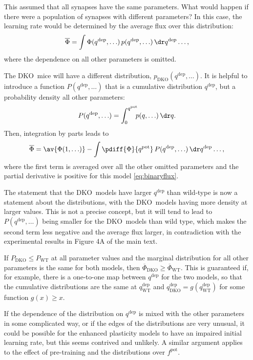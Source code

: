 \documentclass[10pt]{article}
\newcommand{\pot}{^{\text{pot}}}
\newcommand{\dep}{^{\text{dep}}}
\newcommand{\wt}{_{\text{WT}}}
\newcommand{\ko}{_{\text{\KO}}}
\newcommand{\KO}{DKO}
\newcommand{\modelfig}[1][A]{Figure 4#1 of the main text}
\begin{document}
This assumed that all synapses have the same parameters.
What would happen if there were a population of synapses with different parameters?
In this case, the learning rate would be determined by the average flux over this distribution:
%
\begin{equation}\label{eq:meanflux}
  \overline{\Phi} = \int \Phi(q\dep, \ldots) \,
                            p(q\dep, \ldots) \,
                          \dr q\dep \ldots,
\end{equation}
%
where the dependence on all other parameters is omitted.

The \KO\ mice will have a different distribution, $p\ko(q\dep, \ldots)$.
It is helpful to introduce a function $P(q\dep, \ldots)$ that is a cumulative distribution \wrt $q\dep$, but a probability density \wrt all other parameters:
%
\begin{equation}\label{eq:cumul}
  P(q\dep, \ldots) = \int_0^{q\pot} \!\!\! p(q, \ldots) \, \dr q.
\end{equation}
%
Then, integration by parts leads to
%
\begin{equation}\label{eq:fluxcumul}
  \overline{\Phi} = \av{\Phi(1, \ldots)} -
             \int \pdiff{\Phi}{q\pot} \,
                            P(q\dep, \ldots) \,
                          \dr q\dep \ldots,
\end{equation}
%
where the first term is averaged over all the other omitted parameters and the partial derivative is positive for this model \eqref{eq:binaryflux}.

The statement that the \KO\ models have larger $q\dep$ than wild-type is now a statement about the distributions, with the \KO\ models having more density at larger values.
This is not a precise concept, but it will tend to lead to $P(q\dep, \ldots)$ being smaller for the \KO\ models than wild type, which makes the second term less negative and the average flux larger, in contradiction with the experimental results in \modelfig.

If $P\ko \leq P\wt$ at all parameter values and the marginal distribution for all other parameters is the same for both models, then $\overline{\Phi}\ko \geq \overline{\Phi}\wt$.
This is guaranteed if, for example, there is a one-to-one map between $q\dep$ for the two models, so that the cumulative distributions are the same at $q\dep\wt$ and $q\dep\ko = g(q\dep\wt)$ for some function $g(x) \geq x$.

If the dependence of the distribution on $q\dep$ is mixed with the other parameters in some complicated way, or if the edges of the distributions are very unusual, it could be possible for the enhanced plasticity models to have an impaired initial learning rate, but this seems contrived and unlikely.
A similar argument applies to the effect of pre-training and the distributions over $f\pot$.
\end{document}
